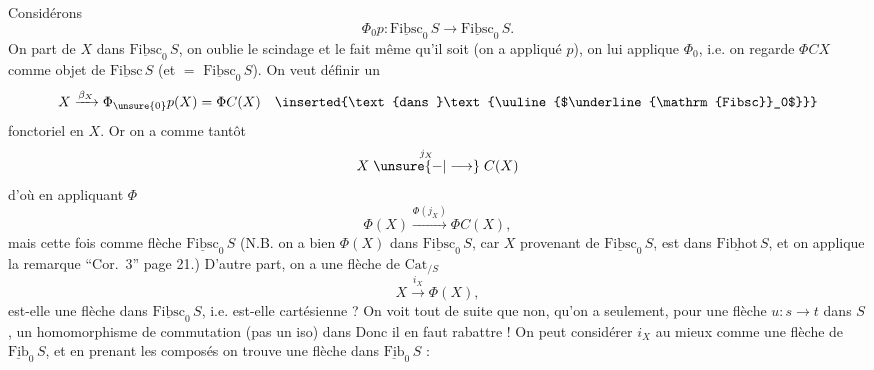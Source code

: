 Considérons
\[
 \Phi_0 p:\underline{\mathrm{Fibsc}}_0\,S\longrightarrow\underline{\mathrm{Fibsc}}_0\,S.
\]
On part de $X$ dans $\underline{\mathrm{Fibsc}}_0\,S$, on oublie le scindage et le fait même qu'il soit 
(on a appliqué $p$), on lui applique $\Phi_0$,  i.e. on regarde $\Phi C X$ comme objet de $\underline{\mathrm{Fibsc}}\,S$ (et $=$  $\underline{\mathrm{Fibsc}}_0\,S$). On veut définir un 
\[
 X\xrightarrow{\beta_X}\Phi_{\unsure{0}}p(X)=\Phi C(X)\quad\inserted{\text{dans }\text{\uuline{$\underline{\mathrm{Fibsc}}_0$}}}
\]
fonctoriel en $X$. Or on a comme tantôt
\[
 X\mathrel{\overset{j_X}{\unsure{\mathord{-}|\longrightarrow}}} C(X)
\]
d'où en appliquant $\Phi$
\[
 \Phi(X)\xrightarrow{\Phi(j_X)}\Phi C(X),
\]
mais  cette fois comme flèche  $\underline{\mathrm{Fibsc}}_0\,S$  (N.B. on a bien $\Phi(X)$ dans $\underline{\mathrm{Fibsc}}_0\,S$, car $X$  provenant de $\underline{\mathrm{Fibsc}}_0\,S$,  est dans $\underline{\mathrm{Fibhot}}\,S$, et on applique la remarque ``Cor.~3'' page 21.) D'autre part, on a une flèche de $\mathrm{Cat}_{/S}$
\[
 X\xrightarrow{i_X}\Phi(X),
\]
est-elle une flèche dans $\underline{\mathrm{Fibsc}}_0\,S$, i.e. est-elle cartésienne ? On voit tout de suite que non, qu'on a seulement, pour une flèche $u:s\longrightarrow t$ dans $S$, un homomorphisme de commutation (pas un iso) dans
Donc il en faut rabattre ! On peut considérer $i_X$ au mieux comme une flèche de $\underline{\mathrm{Fib}}_0\,S$, et en prenant les composés on trouve  une flèche dans $\underline{\mathrm{Fib}}_0\,S$ :
